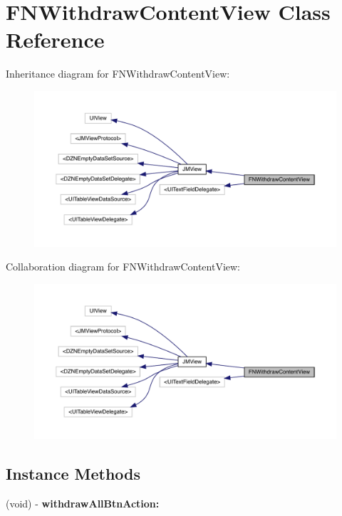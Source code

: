 \hypertarget{interface_f_n_withdraw_content_view}{}\section{F\+N\+Withdraw\+Content\+View Class Reference}
\label{interface_f_n_withdraw_content_view}


Inheritance diagram for F\+N\+Withdraw\+Content\+View\+:\nopagebreak
\begin{figure}[H]
\begin{center}
\leavevmode
\includegraphics[width=350pt]{interface_f_n_withdraw_content_view__inherit__graph}
\end{center}
\end{figure}


Collaboration diagram for F\+N\+Withdraw\+Content\+View\+:\nopagebreak
\begin{figure}[H]
\begin{center}
\leavevmode
\includegraphics[width=350pt]{interface_f_n_withdraw_content_view__coll__graph}
\end{center}
\end{figure}
\subsection*{Instance Methods}
\begin{DoxyCompactItemize}
\item 
\mbox{\label{interface_f_n_withdraw_content_view_afcd6a65ab4a497fa4cb91da388ea6524}} 
(void) -\/ {\bfseries withdraw\+All\+Btn\+Action\+:}
\end{DoxyCompactItemize}
